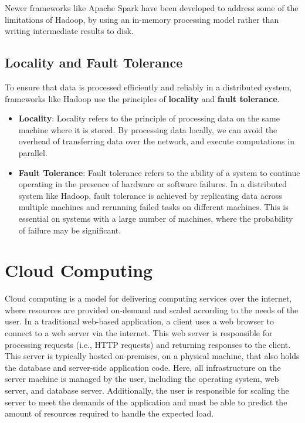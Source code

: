 \documentclass{article}
\begin{document}
Newer frameworks like Apache Spark have been developed to address some
of the limitations of Hadoop, by using an in-memory processing model
rather than writing intermediate results to disk.
\subsection{Locality and Fault Tolerance}
To ensure that data is processed efficiently and reliably in a
distributed system, frameworks like Hadoop use the principles of
\textbf{locality} and \textbf{fault tolerance}.
\begin{itemize}
    \item \textbf{Locality}: Locality refers to the principle of
          processing data on the same machine where it is stored. By
          processing data locally, we can avoid the overhead of
          transferring data over the network, and execute computations
          in parallel.
    \item \textbf{Fault Tolerance}: Fault tolerance refers to the
          ability of a system to continue operating in the presence of
          hardware or software failures. In a distributed system like
          Hadoop, fault tolerance is achieved by replicating data
          across multiple machines and rerunning failed tasks on
          different machines. This is essential on systems with a
          large number of machines, where the probability of failure
          may be significant.
\end{itemize}
\section{Cloud Computing}
Cloud computing is a model for delivering computing services over the
internet, where resources are provided on-demand and scaled according
to the needs of the user. In a traditional web-based application, a
client uses a web browser to connect to a web server via the internet.
This web server is responsible for processing requests (i.e., HTTP
requests) and returning responses to the client. This server is
typically hosted on-premises, on a physical machine, that also holds
the database and server-side application code. Here, all infrastructure
on the server machine is managed by the user, including the operating
system, web server, and database server. Additionally, the user is
responsible for scaling the server to meet the demands of the
application and must be able to predict the amount of resources
required to handle the expected load.
\end{document}
